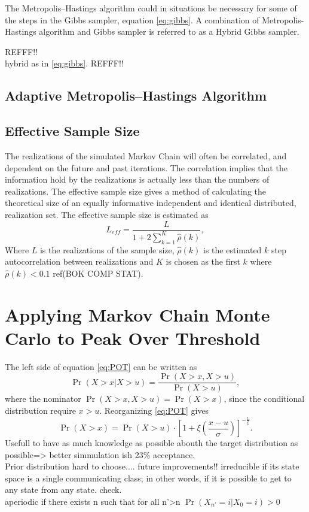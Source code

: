The Metropolis–Hastings algorithm could in situations be necessary for some of the steps in the Gibbs sampler, equation \eqref{eq:gibbs}. A combination of Metropolis-Hastings algorithm and Gibbs sampler is referred to as a Hybrid Gibbs sampler.  

REFFF!!\\
%
%
hybrid as in \eqref{eq:gibbs}.
REFFF!!\\
\subsection{Adaptive Metropolis–Hastings Algorithm}


\subsection{Effective Sample Size}
The realizations of the simulated Markov Chain will often be correlated, and dependent on the future and past iterations. The correlation implies that the information hold by the realizations is actually less than the numbers of realizations. The effective sample size gives a method of calculating the theoretical size of an equally informative independent and identical distributed, realization set. The effective sample size is estimated as
\begin{equation}
L_{eff}=\frac{L}{1+2\sum_{k=1}^{K}\hat{\rho}(k)},
\end{equation}
Where $L$ is the realizations of the sample size, $\hat{\rho}(k)$ is the estimated $k$ step autocorrelation between realizations and $K$ is chosen as the first $k$ where $\hat{\rho}(k)<0.1$ ref(BOK COMP STAT).

\section{Applying Markov Chain Monte Carlo to Peak Over Threshold}
The left side of equation \ref{eq:POT} can be written as %
\begin{equation}
\Pr(X>x|X>u)=\frac{\Pr(X>x,X>u)}{\Pr(X>u)}, 
\end{equation}
where the nominator $\Pr(X>x,X>u)=\Pr(X>x)$, since the conditional distribution require $x>u$. Reorganizing \ref{eq:POT} gives
\begin{equation}
\Pr(X>x)=\Pr(X>u)\cdot \left[1+\xi \left( \frac{x-u}{\sigma}\right)\right]^{-\frac{1}{\xi}}.
\label{eq:ConProbGev}
\end{equation}
%
%
%
%
%
Usefull to have as much knowledge as possible abouth the target distribution as possible=> better simmulation ish 23\% acceptance.\\
Prior distribution hard to choose.... future improvements!!
%
irreducible if its state space is a single communicating class; in other words, if it is possible to get to any state from any state. check.\\
aperiodic if there exists n such that for all n'>n $\Pr(X_{n'}=i|X_0=i)>0$ 


